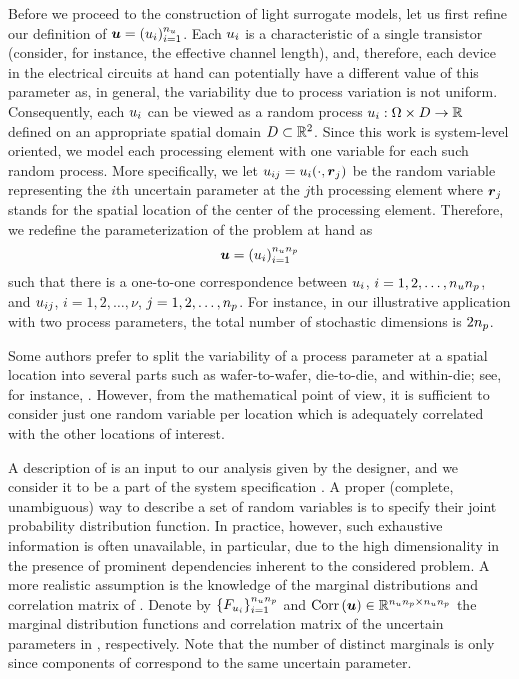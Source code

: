 Before we proceed to the construction of light surrogate models, let us first
refine our definition of $\boldsymbol{u} = (u_i)_{i = 1}^{n_{u}}$. Each $u_i$ is a
characteristic of a single transistor (consider, for instance, the effective
channel length), and, therefore, each device in the electrical circuits at hand
can potentially have a different value of this parameter as, in general, the
variability due to process variation is not uniform. Consequently, each $u_i$
can be viewed as a random process $u_i: \Omega \times D \to \mathbb{R}$ defined on
an appropriate spatial domain $D \subset \mathbb{R}^2$. Since this work is
system-level oriented, we model each processing element with one variable for
each such random process. More specifically, we let $u_{ij} = u_i(\cdot,
\boldsymbol{r}_j)$ be the random variable representing the $i$th uncertain parameter at
the $j$th processing element where $\boldsymbol{r}_j$ stands for the spatial location of
the center of the processing element. Therefore, we redefine the
parameterization \vu of the problem at hand as
\[
  \boldsymbol{u} = (u_i)_{i = 1}^{{n_{u}} {n_{p}}}
\]
such that there is a one-to-one correspondence between $u_i$, $i = 1, 2, \dots,
{n_{u}} {n_{p}}$, and $u_{ij}$, $i = 1, 2, \dots, \nu$, $j = 1, 2, \dots, {n_{p}}$. For
instance, in our illustrative application with two process parameters, the total
number of stochastic dimensions is $2 {n_{p}}$.

\begin{remark}
Some authors prefer to split the variability of a process parameter at a spatial
location into several parts such as wafer-to-wafer, die-to-die, and within-die;
see, for instance, \cite{juan2012}. However, from the mathematical point of
view, it is sufficient to consider just one random variable per location which
is adequately correlated with the other locations of interest.
\end{remark}

A description of \vu is an input to our analysis given by the designer, and we
consider it to be a part of the system specification \spec. A proper (complete,
unambiguous) way to describe a set of random variables is to specify their joint
probability distribution function. In practice, however, such exhaustive
information is often unavailable, in particular, due to the high dimensionality
in the presence of prominent dependencies inherent to the considered problem. A
more realistic assumption is the knowledge of the marginal distributions and
correlation matrix of \vu. Denote by $\{ F_{u_i} \}_{i = 1}^{{n_{u}} {n_{p}}}$ and
$\correlation{\vu} \in \real^{\nu \np \times \nu \np}$ the marginal distribution
functions and correlation matrix of the uncertain parameters \vu in
, respectively. Note that the number of distinct
marginals is only \nu since \np components of \vu correspond to the same
uncertain parameter.

